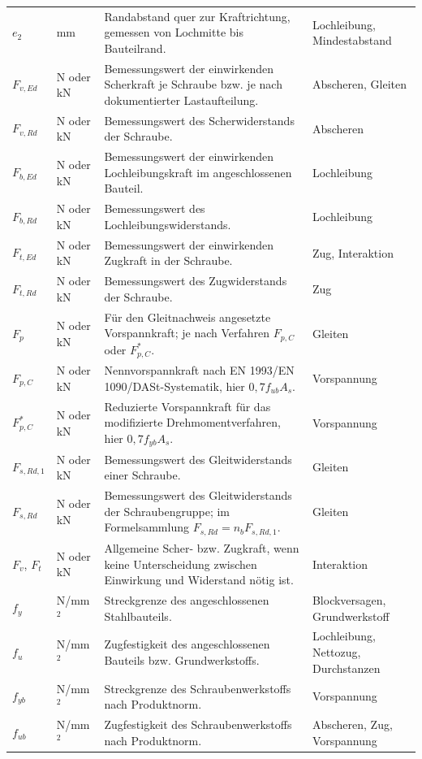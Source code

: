 \documentclass[10pt,a4paper]{article}
\begin{document}
\begin{longtable}{@{}p{25mm}p{24mm}p{82mm}p{24mm}@{}}
$e_2$ & mm & Randabstand quer zur Kraftrichtung, gemessen von Lochmitte bis Bauteilrand. & Lochleibung, Mindestabstand \\
$F_{v,Ed}$ & N oder kN & Bemessungswert der einwirkenden Scherkraft je Schraube bzw. je nach dokumentierter Lastaufteilung. & Abscheren, Gleiten \\
$F_{v,Rd}$ & N oder kN & Bemessungswert des Scherwiderstands der Schraube. & Abscheren \\
$F_{b,Ed}$ & N oder kN & Bemessungswert der einwirkenden Lochleibungskraft im angeschlossenen Bauteil. & Lochleibung \\
$F_{b,Rd}$ & N oder kN & Bemessungswert des Lochleibungswiderstands. & Lochleibung \\
$F_{t,Ed}$ & N oder kN & Bemessungswert der einwirkenden Zugkraft in der Schraube. & Zug, Interaktion \\
$F_{t,Rd}$ & N oder kN & Bemessungswert des Zugwiderstands der Schraube. & Zug \\
$F_p$ & N oder kN & Für den Gleitnachweis angesetzte Vorspannkraft; je nach Verfahren $F_{p,C}$ oder $F_{p,C}^{*}$. & Gleiten \\
$F_{p,C}$ & N oder kN & Nennvorspannkraft nach EN 1993/EN 1090/DASt-Systematik, hier $0{,}7 f_{ub}A_s$. & Vorspannung \\
$F_{p,C}^{*}$ & N oder kN & Reduzierte Vorspannkraft für das modifizierte Drehmomentverfahren, hier $0{,}7 f_{yb}A_s$. & Vorspannung \\
$F_{s,Rd,1}$ & N oder kN & Bemessungswert des Gleitwiderstands einer Schraube. & Gleiten \\
$F_{s,Rd}$ & N oder kN & Bemessungswert des Gleitwiderstands der Schraubengruppe; im Formelsammlung $F_{s,Rd}=n_b F_{s,Rd,1}$. & Gleiten \\
$F_v$, $F_t$ & N oder kN & Allgemeine Scher- bzw. Zugkraft, wenn keine Unterscheidung zwischen Einwirkung und Widerstand nötig ist. & Interaktion \\
$f_y$ & N/mm$^2$ & Streckgrenze des angeschlossenen Stahlbauteils. & Blockversagen, Grundwerkstoff \\
$f_u$ & N/mm$^2$ & Zugfestigkeit des angeschlossenen Bauteils bzw. Grundwerkstoffs. & Lochleibung, Nettozug, Durchstanzen \\
$f_{yb}$ & N/mm$^2$ & Streckgrenze des Schraubenwerkstoffs nach Produktnorm. & Vorspannung \\
$f_{ub}$ & N/mm$^2$ & Zugfestigkeit des Schraubenwerkstoffs nach Produktnorm. & Abscheren, Zug, Vorspannung \\

\end{longtable}
\end{document}
